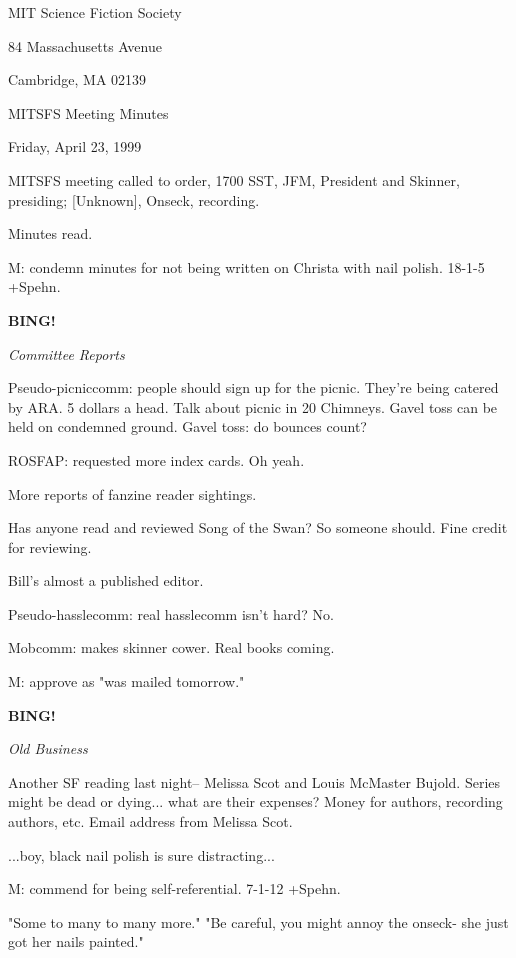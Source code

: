 \documentclass[12pt]{article}
\newcommand{\bing}{{\bf BING!} }
\newcommand{\goto}[1]{\bing \vskip 12pt \centerline{{\em{#1}}}}
\begin{document}
\begin{center}

MIT Science Fiction Society 

84 Massachusetts Avenue

Cambridge, MA 02139

\vspace{12pt}

MITSFS Meeting Minutes 

Friday, April 23, 1999

\end{center}
 
\vspace{18pt}

\setlength{\parskip}{6pt}

\noindent
MITSFS meeting called to order, 1700 SST,
JFM, President and Skinner, presiding; [Unknown], Onseck, recording.

Minutes read.

M: condemn minutes for not being written on Christa with nail polish. 18-1-5 +Spehn.

\goto{Committee Reports}

Pseudo-picniccomm: people should sign up for the picnic. They're being catered by ARA. 5 dollars a head.
Talk about picnic in 20 Chimneys. Gavel toss can be held on condemned ground. Gavel toss: do bounces count?

ROSFAP: requested more index cards. Oh yeah.

More reports of fanzine reader sightings.

Has anyone read and reviewed Song of the Swan? So someone should. Fine credit for reviewing.

Bill's almost a published editor.

Pseudo-hasslecomm: real hasslecomm isn't hard? No.

Mobcomm: makes skinner cower. Real books coming.

M: approve as "was mailed tomorrow."

\goto{Old Business}

Another SF reading last night-- Melissa Scot and Louis McMaster Bujold. Series might be dead or dying... what are their expenses? Money for authors, recording authors, etc. Email address from Melissa Scot.

...boy, black nail polish is sure distracting...

M: commend for being self-referential. 7-1-12 +Spehn.

"Some to many to many more." "Be careful, you might annoy the onseck- she just got her nails painted."
\end{document}

